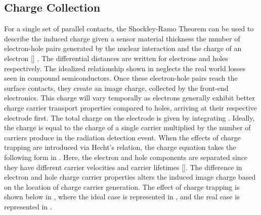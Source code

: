 \documentclass[../../../main.tex]{subfiles}
\begin{document}
%
    \subsection{Charge Collection}%
    \label{sec:chapter-2:semiconductor-detectors:charge-collection}%
    For a single set of parallel contacts, the Shockley-Ramo Theorem can be used to describe the induced charge  given a sensor material thickness  the number of electron-hole pairs generated by the nuclear interaction  and the charge of an electron [] \cite{He_2001}.
    The differential distances  are written for electrons and holes respectively.
    The idealized relationship shown in  neglects the real world losses seen in compound semiconductors.
    Once these electron-hole pairs reach the surface contacts, they create an image charge, collected by the front-end electronics.
    This charge will vary temporally as electrons generally exhibit better charge carrier transport properties compared to holes, arriving at their respective electrode first.
    The total charge on the electrode is given by integrating .
    Ideally, the charge is equal to the charge of a single carrier multiplied by the number of carriers produce in the radiation detection event.
    When the effects of charge trapping are introduced via Hecht’s relation, the charge equation takes the following form in  \cite{book:Knoll_2010}.
    Here, the electron and hole components are separated since they have different carrier velocities  and carrier lifetimes \Xvariable{\tau}[].
    The difference in electron and hole charge carrier properties alters the induced image charge based on the location of charge carrier generation.
    The effect of charge trapping is shown below in , where the ideal case is represented in , and the real case is represented in .
\end{document}
